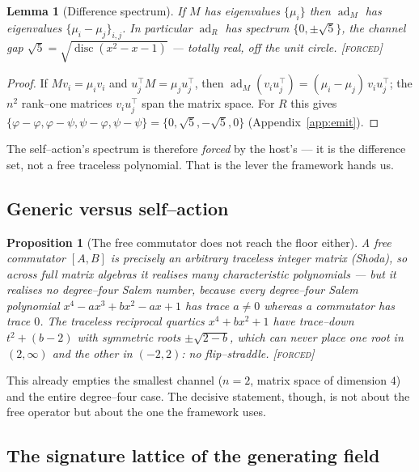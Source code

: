 \documentclass[11pt]{article}
\theoremstyle{plain}
\newtheorem{proposition}[theorem]{Proposition}
\newtheorem{lemma}[theorem]{Lemma}
\theoremstyle{definition}
\theoremstyle{remark}
\newcommand{\forced}{\textcolor{forcedc}{\textsc{[forced]}}}
\begin{document}
\begin{lemma}[Difference spectrum]\label{lem:diffspec}
If $M$ has eigenvalues $\{\mu_i\}$ then $\operatorname{ad}_M$ has eigenvalues $\{\mu_i-\mu_j\}_{i,j}$. In particular $\operatorname{ad}_R$ has spectrum $\{0,\pm\sqrt5\}$, the channel gap $\sqrt5=\sqrt{\operatorname{disc}(x^2-x-1)}$ --- totally real, off the unit circle. \forced
\end{lemma}

\begin{proof}
If $Mv_i=\mu_iv_i$ and $u_j^{\top}M=\mu_ju_j^{\top}$, then $\operatorname{ad}_M(v_iu_j^{\top})=(\mu_i-\mu_j)\,v_iu_j^{\top}$; the $n^2$ rank--one matrices $v_iu_j^{\top}$ span the matrix space. For $R$ this gives $\{\varphi-\varphi,\varphi-\psi,\psi-\varphi,\psi-\psi\}=\{0,\sqrt5,-\sqrt5,0\}$ (Appendix~\ref{app:emit}). \end{proof}

The self--action's spectrum is therefore \emph{forced} by the host's --- it is the difference set, not a free traceless polynomial. That is the lever the framework hands us.

\subsection{Generic versus self--action}\label{sec:genericvs}

\begin{proposition}[The free commutator does not reach the floor either]\label{prop:generic}
A free commutator $[A,B]$ is precisely an arbitrary traceless integer matrix (Shoda), so across full matrix algebras it realises many characteristic polynomials --- but it realises no \emph{degree--four} Salem number, because every degree--four Salem polynomial $x^4-ax^3+bx^2-ax+1$ has trace $a\ne0$ whereas a commutator has trace $0$. The traceless reciprocal quartics $x^4+bx^2+1$ have trace--down $t^2+(b-2)$ with \emph{symmetric} roots $\pm\sqrt{2-b}$, which can never place one root in $(2,\infty)$ and the other in $(-2,2)$: no flip--straddle. \forced
\end{proposition}

This already empties the smallest channel ($n=2$, matrix space of dimension $4$) and the entire degree--four case. The decisive statement, though, is not about the free operator but about the one the framework uses.

\subsection{The signature lattice of the generating field}\label{sec:siglattice}
\end{document}
